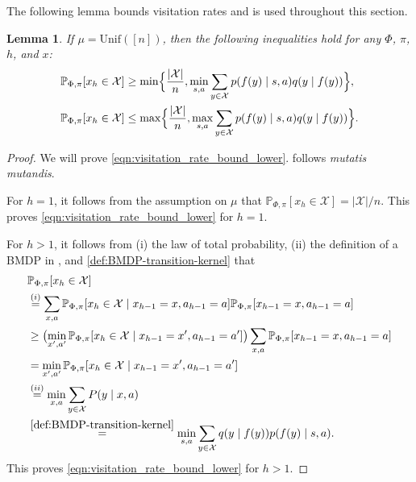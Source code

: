 \documentclass[11pt]{article}
\newcommand{\mcX}{\mathcal{X}}
\newcommand{\mbbP}{\mathbb{P}}
\newtheorem{lemma}[theorem]{Lemma}
\theoremstyle{definition}
\theoremstyle{definition}
\begin{document}
The following lemma bounds visitation rates and is used throughout this section.

\begin{lemma}
	\label{lem:visitation_rate_bound}
	If $\mu=\mathrm{Unif}([n])$, then the following inequalities hold for any $\Phi$, $\pi$, $h$, and $x$:
	\begin{align}
		 &
		\mbbP_{\Phi,\pi}[x_h\in\mcX]
		\geq
		\min
		\Bigl\{
		\frac{|\mcX|}{n}
		,
		\min_{s, a}
		\sum_{y\in\mcX}
		p(f(y) \mid s,a)
		q(y \mid f(y))
		\Bigr\}
		,
		\label{eqn:visitation_rate_bound_lower}
		\\
		 &
		\mbbP_{\Phi,\pi}[x_h\in\mcX]
		\leq
		\max
		\Bigl\{
		\frac{|\mcX|}{n}
		,
		\max_{s, a}
		\sum_{y\in\mcX}
		p(f(y) \mid s,a)
		q(y \mid f(y))
		\Bigr\}
		.
		\label{eqn:visitation_rate_bound_upper}
	\end{align}
\end{lemma}

\begin{proof}
	We will prove \eqref{eqn:visitation_rate_bound_lower}.
	 follows \emph{mutatis mutandis}.

	For $h = 1$, it follows from the assumption on $\mu$ that $\mbbP_{\Phi,\pi}[x_h\in \mcX] = |\mcX|/n$.
	This proves \eqref{eqn:visitation_rate_bound_lower} for $h = 1$.

	For $h > 1$,
	it follows from
	(i) the law of total probability,
	(ii) the definition of a \gls{BMDP} in ,
	and
	\eqref{def:BMDP-transition-kernel}
	that
	\begin{align}
		 &
		\mbbP_{\Phi,\pi}[x_{h}\in\mcX]
		\nonumber
		\\
		 &
		\overset{(i)}{=}
		\sum_{x, a}
		\mbbP_{\Phi,\pi}[x_{h} \in \mcX \mid x_{h-1} = x,a_{h-1}=a]
		\mbbP_{\Phi,\pi}[x_{h-1}=x,a_{h-1}=a]
		\nonumber
		\\
		 &
		\geq
		\bigl(
		\min_{x', a'}
		\mbbP_{\Phi,\pi}[x_{h} \in \mcX \mid x_{h-1} = x', a_{h-1}=a']
		\bigr)
		\sum_{x, a}
		\mbbP_{\Phi,\pi}[x_{h-1}=x,a_{h-1}=a]
		\nonumber
		\\
		 &
		=
		\min_{x', a'}
		\mbbP_{\Phi,\pi}[x_{h} \in \mcX \mid x_{h-1} = x', a_{h-1}=a']
		\nonumber
		\\
		 &
		\overset{(ii)}{=}
		\min_{x, a}
		\sum_{y\in\mcX}
		P(y \mid x,a)
		\nonumber
		\\
		 &
		\overset{\eqref{def:BMDP-transition-kernel}}{=}
		\min_{s, a}
		\sum_{y\in\mcX}
		q(y \mid f(y))p(f(y) \mid s,a)
		.
	\end{align}
	This proves \eqref{eqn:visitation_rate_bound_lower} for $h > 1$.
\end{proof}
\end{document}
